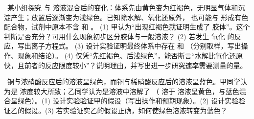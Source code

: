 \begin{xiti}
\item {}\ 某小组探究  与  溶液混合后的变化：体系先由黄色变为红褐色，无明显气体和沉淀产生；放置后逐渐变为浅绿色。已知除水解、氧化还原外， 也可能与  形成有色配合物，试剂中原本不含  和 。
(1) 甲认为“出现红褐色就证明生成了  胶体”。这个判断是否充分？可用什么现象初步区分胶体与一般溶液？
(2) 若发生  氧化  的反应，写出离子方程式。
(3) 设计实验证明最终体系中存在  和 （分别取样，写出操作、现象和结论）。
(4) 仅凭“先红褐色、后浅绿色”，能否断言“水解比氧化还原快，且前者的反应限度较小”？说明理由，并写出进一步研究速率需要测量的量。

\item {}\ 铜与浓硝酸反应后的溶液呈绿色，而铜与稀硝酸反应后的溶液呈蓝色。甲同学认为是  浓度较大所致；乙同学认为是溶液中溶解了 （ 溶于  溶液呈黄色，与蓝色混合呈绿色）。(1) 设计实验验证甲的假设（写出操作和预期现象）。(2) 设计实验验证乙的假设。(3) 若实验证实乙的假设正确，如何使绿色溶液转变为蓝色？
\end{xiti}

